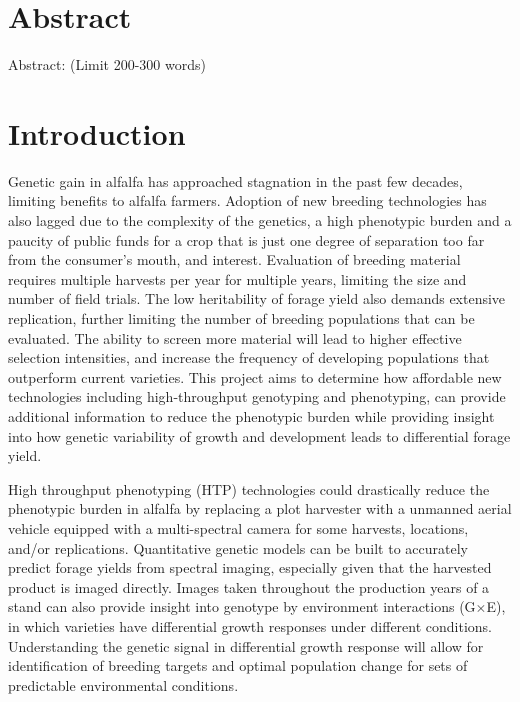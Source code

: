 \documentclass[12pt, letterpaper]{article}
\newcommand{\GxE}{G$\times$E}
\begin{document}



\section{Abstract}

Abstract: (Limit 200-300 words)

\section{Introduction}


Genetic gain in alfalfa has approached stagnation in the past few decades, limiting benefits to alfalfa farmers. Adoption of new breeding technologies has also lagged due to the complexity of the genetics, a high phenotypic burden and a paucity of public funds for a crop that is just one degree of separation too far from the consumer's mouth, and interest. Evaluation of breeding material requires multiple harvests per year for multiple years, limiting the size and number of field trials. The low heritability of forage yield also demands extensive replication, further limiting the number of breeding populations that can be evaluated. The ability to screen more material will lead to higher effective selection intensities, and increase the frequency of developing populations that outperform current varieties. This project aims to determine how affordable new technologies including high-throughput genotyping and phenotyping, can provide additional information to reduce the phenotypic burden while providing insight into how genetic variability of growth and development leads to differential forage yield. 

High throughput phenotyping (HTP) technologies could drastically reduce the phenotypic burden in alfalfa by replacing a plot harvester with a unmanned aerial vehicle equipped with a multi-spectral camera for some harvests, locations, and/or replications. Quantitative genetic models can be built to accurately predict forage yields from spectral imaging, especially given that the harvested product is imaged directly. Images taken throughout the production years of a stand can also provide insight into genotype by environment interactions (\GxE), in which varieties have differential growth responses under different conditions. Understanding the genetic signal in differential growth response will allow for identification of breeding targets and optimal population change for sets of predictable environmental conditions. 
\end{document}
